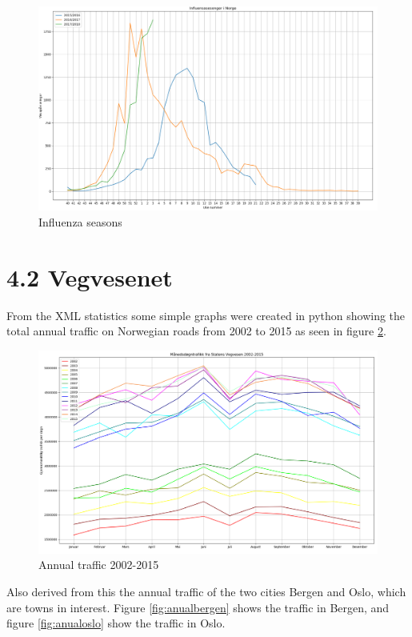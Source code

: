 \documentclass[11pt]{report}
\begin{document}
\begin{figure}[ht]
\includegraphics[width=16cm]{influenza_15_till_18}
\centering
\caption{Influenza seasons}
\label{fig:infstat}
\end{figure}

\newpage

\section*{4.2 Vegvesenet}
From the XML statistics some simple graphs were created in python showing the total annual traffic on Norwegian roads from 2002 to 2015 as seen in figure \ref{fig:anualtotal}. 

\begin{figure}[ht]
\includegraphics[width=16cm]{xml_02_15_annual_total}
\centering
\caption{Annual traffic 2002-2015}
\label{fig:anualtotal}
\end{figure}

Also derived from this the annual traffic of the two cities Bergen and Oslo, which are towns in interest. Figure \ref{fig:anualbergen} shows the traffic in Bergen, and figure \ref{fig:anualoslo} show the traffic in Oslo.
\end{document}
